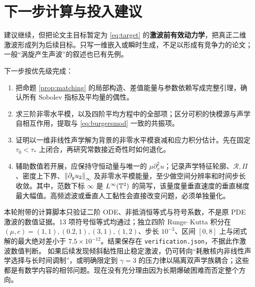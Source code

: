 \section{下一步计算与投入建议}
建议继续，但把论文主目标暂定为 \eqref{eq:target} 的\textbf{激波前有效动力学}，把真正二维激波形成列为后续目标。只写一维嵌入或瞬时生成，不足以形成有竞争力的论文；一般“涡旋产生声波”的叙述也已有先例。

下一步按优先级完成：
\begin{enumerate}
\item 把命题 \ref{prop:matching} 的局部构造、差值能量与参数依赖写成完整引理，确认所有 Sobolev 指标及平均量的偶性。
\item 求三阶非零水平模，以及四阶平均方程中的全部项；区分可积的快模源与声学自相互作用，提取与 \eqref{eq:burgersmod} 一致的共振项。
\item 证明以一维非线性声学解为背景的非零水平模衰减和应力积分估计。先在固定 $\tau_0<\tau_*$ 上闭合，再研究常数接近奇性时如何退化。
\item 辅助数值若开展，应保持守恒动量与唯一的 $\mu\partial_x^2u$；记录声学特征轮廓、$\mathcal R,\Pi$、密度上下界、$\left\|\partial_yu_2\right\|_\infty$ 及非零水平模能量，至少做空间分辨率和时间步长收敛。其中，范数下标 $\infty$ 是 $L^\infty(\mathbb T^2)$ 的简写，该量度量垂直速度的垂直梯度最大幅值。高频滤波或垂直人工黏性会直接改变问题，必须单独量化。
\end{enumerate}
本轮附带的计算脚本只验证二阶 ODE、非抵消恒等式与符号系数，不是原 PDE 激波的数值证据。13 项符号恒等式均通过；独立四阶 Runge--Kutta 积分在 $(\mu,c)=(1,1),(0.2,1),(3,1),(1,2)$、步长 $10^{-3}$、区间 $[0,8]$ 上与闭式解的最大绝对差小于 $7.5\times10^{-12}$。结果保存在 \texttt{verification.json}，不据此作激波数值判断。
如果后续发现倾斜黏性阻止稳定激波，仍可转向“耗散核内非线性声学选择与长时间调制”，或明确限定到 $\gamma=3$ 的压力律以隔离双声学族耦合；这些都是有数学内容的相邻问题。现在没有充分理由因为长期爆破困难而否定整个方向。
